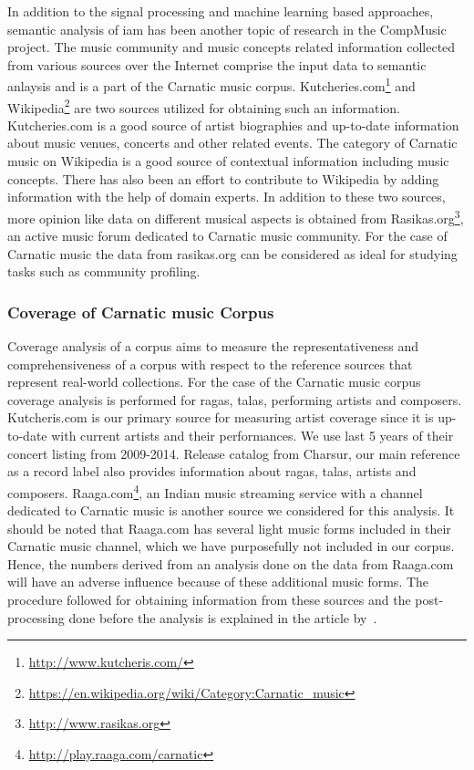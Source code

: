In addition to the signal processing and machine learning based approaches, semantic analysis of \gls{iam} has been another topic of research in the CompMusic project. The music community and music concepts related information collected from various sources over the Internet comprise the input data to semantic anlaysis and is a part of the Carnatic music corpus. Kutcheries.com\footnote{\url{http://www.kutcheris.com/}} and Wikipedia\footnote{\url{https://en.wikipedia.org/wiki/Category:Carnatic_music}} are two sources utilized for obtaining such an information. Kutcheries.com is a good source of artist biographies and up-to-date information about music venues, concerts and other related events. The category of Carnatic music on Wikipedia is a good source of contextual information including music concepts. There has also been an effort to contribute to Wikipedia by adding information with the help of domain experts. In addition to these two sources, more opinion like data on different musical aspects is obtained from Rasikas.org\footnote{\url{http://www.rasikas.org}}, an active music forum dedicated to Carnatic music community. For the case of Carnatic music the data from rasikas.org can be considered as ideal for studying tasks such as community profiling.


\subsubsection{Coverage of Carnatic music Corpus}
\label{sec:corpus_coverage_of_carnatic_music_corpus}

Coverage analysis of a corpus aims to measure the representativeness and comprehensiveness of a corpus with respect to the reference sources that represent real-world collections. For the case of the Carnatic music corpus coverage analysis is performed for \glspl{raga}, \glspl{tala}, performing artists and composers. Kutcheris.com is our primary source for measuring artist coverage since it is up-to-date with current artists and their performances. We use last 5 years of their concert listing from 2009-2014. Release catalog from Charsur, our main reference as a record label also provides information about \glspl{raga}, \glspl{tala}, artists and composers. Raaga.com\footnote{\url{http://play.raaga.com/carnatic}}, an Indian music streaming service with a channel dedicated to Carnatic music is another source we considered for this analysis. It should be noted that Raaga.com has several light music forms included in their Carnatic music channel, which we have purposefully not included in our corpus. Hence, the numbers derived from an analysis done on the data from Raaga.com will have an adverse influence because of these additional music forms. The procedure followed for obtaining information from these sources and the post-processing done before the analysis is explained in the article by~\cite{CM_Corpora_Ajay14}.

